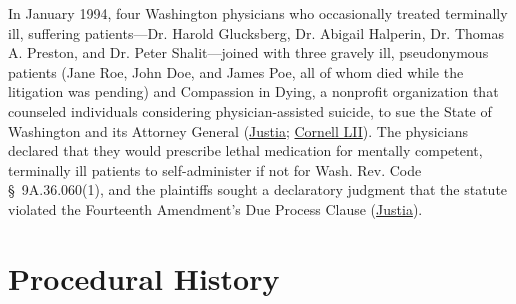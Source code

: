 \documentclass[12pt]{article}
\begin{document}
In January 1994, four Washington physicians who occasionally treated terminally ill, suffering patients---Dr. Harold Glucksberg, Dr. Abigail Halperin, Dr. Thomas A. Preston, and Dr. Peter Shalit---joined with three gravely ill, pseudonymous patients (Jane Roe, John Doe, and James Poe, all of whom died while the litigation was pending) and Compassion in Dying, a nonprofit organization that counseled individuals considering physician-assisted suicide, to sue the State of Washington and its Attorney General (\href{https://supreme.justia.com/cases/federal/us/521/702/}{Justia}; \href{https://www.law.cornell.edu/supct/html/96-110.ZO.html}{Cornell LII}). The physicians declared that they would prescribe lethal medication for mentally competent, terminally ill patients to self-administer if not for Wash. Rev. Code \S~9A.36.060(1), and the plaintiffs sought a declaratory judgment that the statute violated the Fourteenth Amendment's Due Process Clause (\href{https://supreme.justia.com/cases/federal/us/521/702/}{Justia}).

\section{Procedural History}
\end{document}
